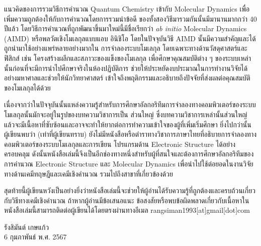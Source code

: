 {แนวคิดของการรวมวิธีการคำนวณ Quantum Chemistry เข้ากับ Molecular Dynamics เพื่อเพิ่มความถูกต้องให้กับการคำนวณโดยการรวมนำข้อดี%
ของทั้งสองวิธีมารวมกันนั้นมีมานานมากกว่า 40 ปีแล้ว โดยวิธีการคำนวณที่ถูกพัฒนาขึ้นมาใหม่นี้มีชื่อเรียกว่า \textit{ab initio} Molecular 
Dynamics (AIMD) หรือพลวัตเชิงโมเลกุลแบบแอบ อินิชิโอ โดยในปัจจุบันวิธี AIMD นั้นมีความสำคัญและได้ถูกนำมาใช้อย่างแพร่หลายอย่างมากใน%
การจำลองระบบโมเลกุล โดยเฉพาะทางด้านวัสดุศาสตร์และฟิสิกส์ เช่น โครงสร้างผลึกและสภาวะของแข็งของโมเลกุล เพื่อศึกษาคุณสมบัติต่าง ๆ 
ของระบบเหล่านั้นก่อนที่จะมีการนำไปศึกษาจริงในห้องปฏิบัติการ ช่วยให้ประหยัดงบประมาณในการทำงานวิจัยได้อย่างมหาศาลและช่วยให้นักวิทยาศาสตร์%
เข้าใจถึงพฤติกรรมและอธิบายถึงปัจจัยที่ส่งผลต่อคุณสมบัติของโมเลกุลได้ด้วย 

เนื่องจากว่าในปัจจุบันนั้นแหล่งความรู้สำหรับการศึกษาอัลกอริทึมการจำลองทางคอมพิวเตอร์ของระบบโมเลกุลนั้นมักจะอยู่ในรูปของบทความวิชาการเป็น%
ส่วนใหญ่ ซึ่งบทความวิชาการเหล่านั้นส่วนใหญ่แล้วจะมีเนื้อหาที่ซับซ้อนและอาจจะทำให้ยากต่อการทำความเข้าใจของผู้ที่เพิ่มเริ่มศึกษา ยิ่งไปกว่านั้น%
ผู้เขียนพบว่า (เท่าที่ผู้เขียนทราบ) ยังไม่มีหนังสือหรือตำราทางวิชาการภาษาไทยที่อธิบายการจำลองทางคอมพิวเตอร์ของระบบโมเลกุลและการเขียน%
โปรแกรมด้าน Electronic Structure ได้อย่างครอบคลุม ดังนั้นหนังสือเล่มนี้จึงเป็นอีกช่องทางหนึ่งสำหรับผู้ที่สนใจและต้องการศึกษาอัลกอริทึมของ%
การคำนวณ Electronic Structure และ Molecular Dynamics เพื่อนำไปใช้ต่อยอดในงานวิจัยทางด้านเคมีทฤษฎีและเคมีเชิงคำนวณ 
รวมไปถึงสาขาที่เกี่ยวข้องด้วย

สุดท้ายนี้ผู้เขียนหวังเป็นอย่างยิ่งว่าหนังสือเล่มนี้จะช่วยให้ผู้อ่านได้รับความรู้ที่ถูกต้องและครบถ้วนเกี่ยวกับวิธีทางเคมีเชิงคำนวณ ถ้าหากผู้อ่านมีข้อเสนอแนะ 
ข้อสงสัยหรือพบข้อผิดพลาดเกี่ยวกับเนื้อหาในหนังสือเล่มนี้สามารถติดต่อผู้เขียนได้โดยตรงผ่านทางอีเมล rangsiman1993[at]gmail[dot]com

\medskip

\begin{flushright}
รังสิมันต์ เกษแก้ว \\
6 กุมภาพันธ์ พ.ศ. 2567
\end{flushright}
}
